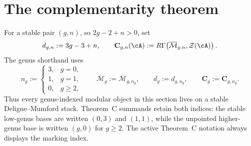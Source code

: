 \section{The complementarity theorem}
\label{sec:complementarity-theorem}

\providecommand{\BRST}{\mathrm{BRST}}

\begin{convention}
\label{conv:theorem-c-stable-base}
For a stable pair \((g,n)\), so \(2g-2+n>0\), set
\[
 d_{g,n}:=3g-3+n,
 \qquad
 \mathbf C_{g,n}(\cA)
 :=R\Gamma\!\left(\overline{\mathcal M}_{g,n},\mathcal Z(\cA)\right).
\]
The genus shorthand uses
\[
 n_g:=
 \begin{cases}
  3,&g=0,\\
  1,&g=1,\\
  0,&g\geq2,
 \end{cases}
 \qquad
 \overline{\mathcal M}_g:=\overline{\mathcal M}_{g,n_g},
 \qquad
 d_g:=d_{g,n_g},
 \qquad
 \mathbf C_g:=\mathbf C_{g,n_g}.
\]
Thus every genus-indexed modular object in this section lives on a
stable Deligne--Mumford stack.  Theorem~C summands retain both indices:
the stable low-genus bases are written \((0,3)\) and \((1,1)\), while
the unpointed higher-genus base is written \((g,0)\) for \(g\geq2\).
The active Theorem~C notation always displays the marking index.
\end{convention}


